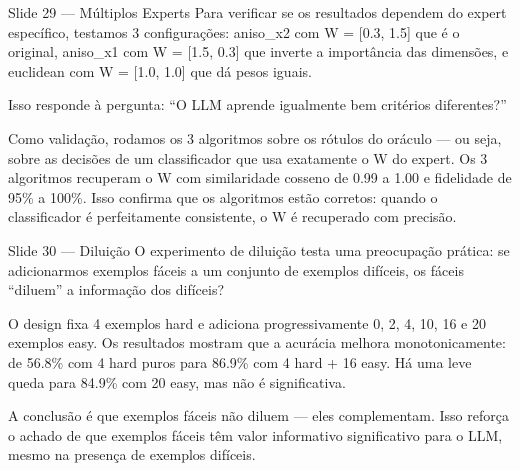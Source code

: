 \documentclass[aspectratio=169,11pt]{beamer}
\begin{document}
\begin{frame}{Slide 29 --- Múltiplos Experts}
\small
Para verificar se os resultados dependem do expert específico, testamos 3 configurações: aniso\_x2 com W = [0.3, 1.5] que é o original, aniso\_x1 com W = [1.5, 0.3] que inverte a importância das dimensões, e euclidean com W = [1.0, 1.0] que dá pesos iguais.

Isso responde à pergunta: ``O LLM aprende igualmente bem critérios diferentes?''

Como validação, rodamos os 3 algoritmos sobre os rótulos do oráculo --- ou seja, sobre as decisões de um classificador que usa exatamente o W do expert. Os 3 algoritmos recuperam o W com similaridade cosseno de 0.99 a 1.00 e fidelidade de 95\% a 100\%. Isso confirma que os algoritmos estão corretos: quando o classificador é perfeitamente consistente, o W é recuperado com precisão.
\end{frame}

\begin{frame}{Slide 30 --- Diluição}
\small
O experimento de diluição testa uma preocupação prática: se adicionarmos exemplos fáceis a um conjunto de exemplos difíceis, os fáceis ``diluem'' a informação dos difíceis?

O design fixa 4 exemplos hard e adiciona progressivamente 0, 2, 4, 10, 16 e 20 exemplos easy. Os resultados mostram que a acurácia melhora monotonicamente: de 56.8\% com 4 hard puros para 86.9\% com 4 hard + 16 easy. Há uma leve queda para 84.9\% com 20 easy, mas não é significativa.

A conclusão é que exemplos fáceis não diluem --- eles complementam. Isso reforça o achado de que exemplos fáceis têm valor informativo significativo para o LLM, mesmo na presença de exemplos difíceis.
\end{frame}
\end{document}

